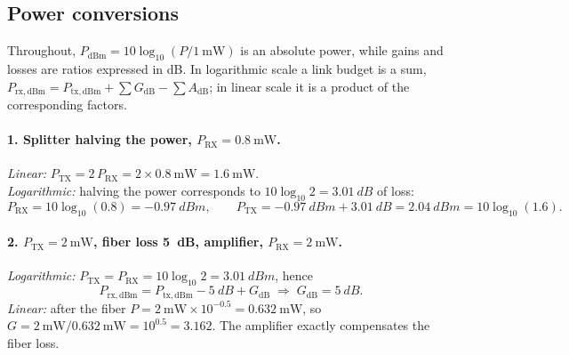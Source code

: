 
\subsection{Power conversions}
\label{sec:2_3}
Throughout, $P_\mathrm{dBm} = 10\log_{10}(P/\SI{1}{\milli\watt})$ is an absolute power,
while gains and losses are ratios expressed in dB. In logarithmic scale a link budget is a sum,
$P_\mathrm{rx,dBm} = P_\mathrm{tx,dBm} + \sum G_\mathrm{dB} - \sum A_\mathrm{dB}$;
in linear scale it is a product of the corresponding factors.

\paragraph{1. Splitter halving the power, $P_\mathrm{RX} = \SI{0.8}{\milli\watt}$.}
\emph{Linear:} $P_\mathrm{TX} = 2\,P_\mathrm{RX} = 2\times\SI{0.8}{\milli\watt} = \SI{1.6}{\milli\watt}$.\\
\emph{Logarithmic:} halving the power corresponds to $10\log_{10}2 = \SI{3.01}{dB}$ of loss:
\begin{equation}
  P_\mathrm{RX} = 10\log_{10}(0.8) = \SI{-0.97}{dBm}, \qquad
  P_\mathrm{TX} = \SI{-0.97}{dBm} + \SI{3.01}{dB} = \SI{2.04}{dBm} = 10\log_{10}(1.6) .
\end{equation}

\paragraph{2. $P_\mathrm{TX} = \SI{2}{\milli\watt}$, fiber loss \SI{5}{dB}, amplifier, $P_\mathrm{RX} = \SI{2}{\milli\watt}$.}
\emph{Logarithmic:} $P_\mathrm{TX} = P_\mathrm{RX} = 10\log_{10}2 = \SI{3.01}{dBm}$, hence
\begin{equation}
  P_\mathrm{rx,dBm} = P_\mathrm{tx,dBm} - \SI{5}{dB} + G_\mathrm{dB}
  \;\Rightarrow\; G_\mathrm{dB} = \SI{5}{dB}.
\end{equation}
\emph{Linear:} after the fiber $P = \SI{2}{\milli\watt}\times10^{-0.5} = \SI{0.632}{\milli\watt}$, so
$G = \SI{2}{\milli\watt}/\SI{0.632}{\milli\watt} = 10^{0.5} = 3.162$.
The amplifier exactly compensates the fiber loss.

